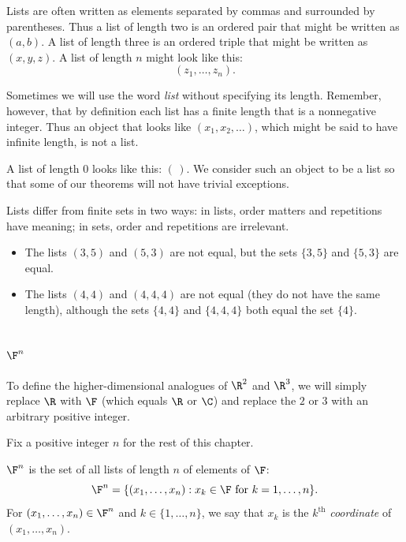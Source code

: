 %
Lists are often written as elements separated by commas and surrounded by
parentheses. Thus a list of length two is an ordered pair that might be written
as $(a,b)$. A list of length three is an ordered triple that might be written
as $(x,y,z)$. A list of length $n$ might look like this:
\[ (z_1,\dots,z_n). \]

Sometimes we will use the word \emph{list} without specifying its length.
Remember, however, that by definition each list has a finite length that is a
nonnegative integer. Thus an object that looks like $(x_1,x_2,\dots)$, which
might be said to have infinite length, is not a list.

A list of length $0$ looks like this: $(\,)$. We consider such an object to be
a list so that some of our theorems will not have trivial exceptions.

Lists differ from finite sets in two ways: in lists, order matters and
repetitions have meaning; in sets, order and repetitions are irrelevant.

\begin{example}\label{ax:1.9}\leavevmode
\begin{itemize}
\item The lists $(3,5)$ and $(5,3)$ are not equal, but the sets $\{3,5\}$ and
  $\{5,3\}$ are equal.
\item The lists $(4,4)$ and $(4,4,4)$ are not equal (they do not have the same
  length), although the sets $\{4,4\}$ and $\{4,4,4\}$ both equal the set
  $\{4\}$.
\end{itemize}
\end{example}

\subsection{\texorpdfstring{$\F^n$}{F^n}}

To define the higher-dimensional analogues of $\R^2$ and $\R^3$, we will simply
replace $\R$ with $\F$ (which equals $\R$ or $\C$) and replace the $2$ or $3$
with an arbitrary positive integer.

\begin{notation}[$n$]\label{ax:1.10}
Fix a positive integer $n$ for the rest of this chapter.
\end{notation}

\begin{definition}[$\F^n$, coordinate]\label{ax:1.11}
$\F^n$ is the set of all lists of length $n$ of elements of $\F$:
\[ \F^n = \{(x_1,\dots,x_n) : x_k\in\F \text{ for } k=1,\dots,n\}. \]
For $(x_1,\dots,x_n)\in\F^n$ and $k\in\{1,\dots,n\}$, we say that $x_k$ is the
$k^{\text{th}}$ \emph{coordinate} of $(x_1,\dots,x_n)$.
\end{definition}

